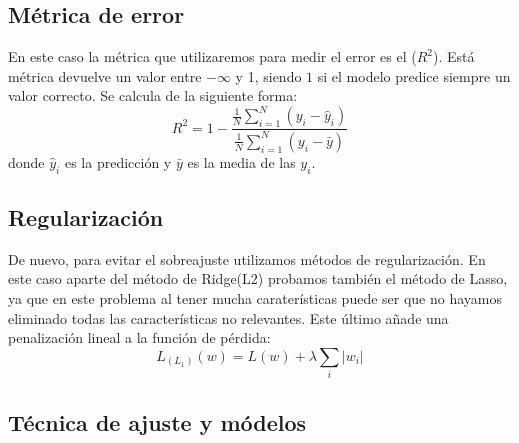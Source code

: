 \documentclass[size=a4, parskip=half, titlepage=false, toc=flat, toc=bib, 12pt]{scrartcl}
\begin{document}
\subsection{Métrica de error}

En este caso la métrica que utilizaremos para medir el error es el  ($R^2$). Está métrica devuelve un valor entre $-\infty$ y 1, siendo $1$ si el modelo predice siempre un valor correcto. Se calcula de la siguiente forma:
$$ R^2 = 1 - \frac{\frac{1}{N} \sum_{i = 1}^N (y_i - \hat{y}_i)}{\frac{1}{N} \sum_{i = 1}^N (y_i - \bar{y})} $$
donde $\hat{y}_i$ es la predicción y $\bar{y}$ es la media de las $y_i$.

\subsection{Regularización}

De nuevo, para evitar el sobreajuste utilizamos métodos de regularización. En este caso aparte del método de Ridge(L2) probamos también el método de Lasso, ya que en este problema al tener mucha caraterísticas puede ser que no hayamos eliminado todas las características no relevantes. Este último añade una penalización lineal a la función de pérdida:
$$L_{(L_1)}(w) = L(w) + \lambda \sum_i |w_i| $$
\subsection{Técnica de ajuste y módelos}
\end{document}
